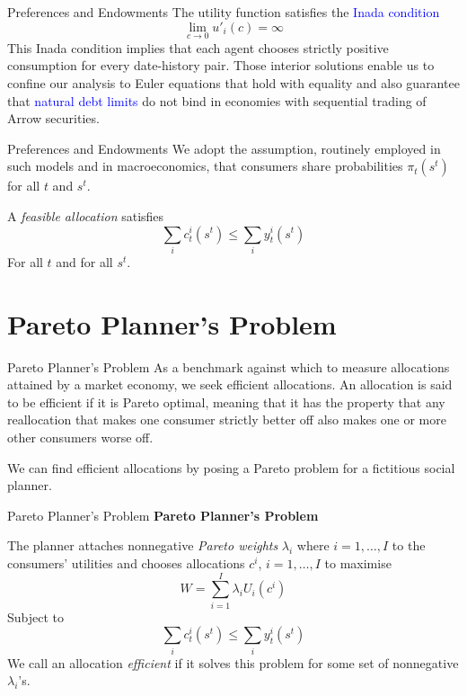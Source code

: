 \documentclass[aspectratio=169,xcolor=dvipsnames]{beamer}
\begin{document}
\begin{frame}{Preferences and Endowments}
    The utility function satisfies the \textcolor{blue}{Inada condition}
    \[
        \lim_{c \to 0} u'_i(c) = \infty
    \]
    This Inada condition implies that each agent chooses strictly positive consumption for every date-history pair. Those interior solutions enable us to confine our analysis to Euler equations that hold with equality and also guarantee that \textcolor{blue}{natural debt limits} do not bind in economies with sequential trading of Arrow securities.
\end{frame}

\begin{frame}{Preferences and Endowments}
    We adopt the assumption, routinely employed in such models and in macroeconomics, that consumers share probabilities $\pi_t(s^t)$ for all $t$ and $s^t$.

    A \emph{feasible allocation} satisfies
    \[
        \sum_i c^i_t(s^t) \le \sum_i y^i_t(s^t)
    \]
    For all $t$ and for all $s^t$.
\end{frame}

\section{Pareto Planner's Problem}

\begin{frame}{Pareto Planner's Problem}
    As a benchmark against which to measure allocations attained by a market economy, we seek efficient allocations. An allocation is said to be efficient if it is Pareto optimal, meaning that it has the property that any reallocation that makes one consumer strictly better off also makes one or more other consumers worse off.

    We can find efficient allocations by posing a Pareto problem for a fictitious social planner.
\end{frame}

\begin{frame}{Pareto Planner's Problem}
    \textbf{Pareto Planner's Problem}

    The planner attaches nonnegative \emph{Pareto weights} $\lambda_i$ where $i = 1, \dots, I$ to the consumers' utilities and chooses allocations $c^i$, $i = 1, \dots, I$ to maximise
    \[
        W = \sum_{i=1}^I \lambda_i U_i(c^i)
    \]
    Subject to
    \[
        \sum_i c^i_t(s^t) \le \sum_i y^i_t(s^t)
    \]
    We call an allocation \emph{efficient} if it solves this problem for some set of nonnegative $\lambda_i$'s.
\end{frame}
\end{document}
